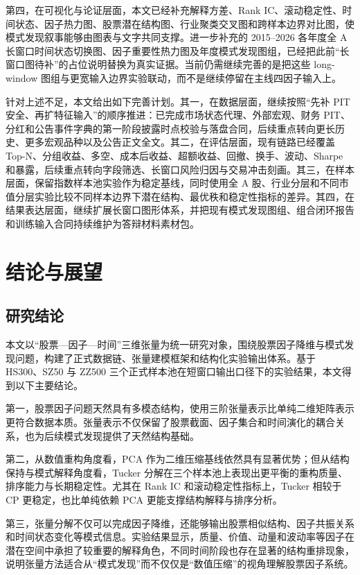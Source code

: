 第四，在可视化与论证层面，本文已经补充解释方差、Rank IC、滚动稳定性、时间状态、因子热力图、股票潜在结构图、行业聚类交叉图和跨样本边界对比图，使模式发现叙事能够由图表与文字共同支撑。进一步补充的 2015--2026 各年度全 A 长窗口时间状态切换图、因子重要性热力图及年度模式发现图组，已经把此前“长窗口图待补”的占位说明替换为真实证据。当前仍需继续完善的是把这些 long-window 图组与更宽输入边界实验联动，而不是继续停留在主线四因子输入上。

针对上述不足，本文给出如下完善计划。其一，在数据层面，继续按照“先补 PIT 安全、再扩特征输入”的顺序推进：已完成市场状态代理、外部宏观、财务 PIT、分红和公告事件字典的第一阶段披露时点校验与落盘合同，后续重点转向更长历史、更多宏观品种以及公告正文全文。其二，在评估层面，现有链路已经覆盖 Top-N、分组收益、多空、成本后收益、超额收益、回撤、换手、波动、Sharpe 和暴露，后续重点转向字段筛选、长窗口风险归因与交易冲击刻画。其三，在样本层面，保留指数样本池实验作为稳定基线，同时使用全 A 股、行业分层和不同市值分层实验比较不同样本边界下潜在结构、最优秩和稳定性指标的差异。其四，在结果表达层面，继续扩展长窗口图形体系，并把现有模式发现图组、组合闭环报告和训练输入合同持续维护为答辩材料素材包。

\chapter{结论与展望}

\section{研究结论}

本文以“股票—因子—时间”三维张量为统一研究对象，围绕股票因子降维与模式发现问题，构建了正式数据链、张量建模框架和结构化实验输出体系。基于 HS300、SZ50 与 ZZ500 三个正式样本池在短窗口输出口径下的实验结果，本文得到以下主要结论。

第一，股票因子问题天然具有多模态结构，使用三阶张量表示比单纯二维矩阵表示更符合数据本质。张量表示不仅保留了股票截面、因子集合和时间演化的耦合关系，也为后续模式发现提供了天然结构基础。

第二，从数值重构角度看，PCA 作为二维压缩基线依然具有显著优势；但从结构保持与模式解释角度看，Tucker 分解在三个样本池上表现出更平衡的重构质量、排序能力与长期稳定性。尤其在 Rank IC 和滚动稳定性指标上，Tucker 相较于 CP 更稳定，也比单纯依赖 PCA 更能支撑结构解释与排序分析。

第三，张量分解不仅可以完成因子降维，还能够输出股票相似结构、因子共振关系和时间状态变化等模式信息。实验结果显示，质量、价值、动量和波动率等因子在潜在空间中承担了较重要的解释角色，不同时间阶段也存在显著的结构重排现象，说明张量方法适合从“模式发现”而不仅仅是“数值压缩”的视角理解股票因子系统。

